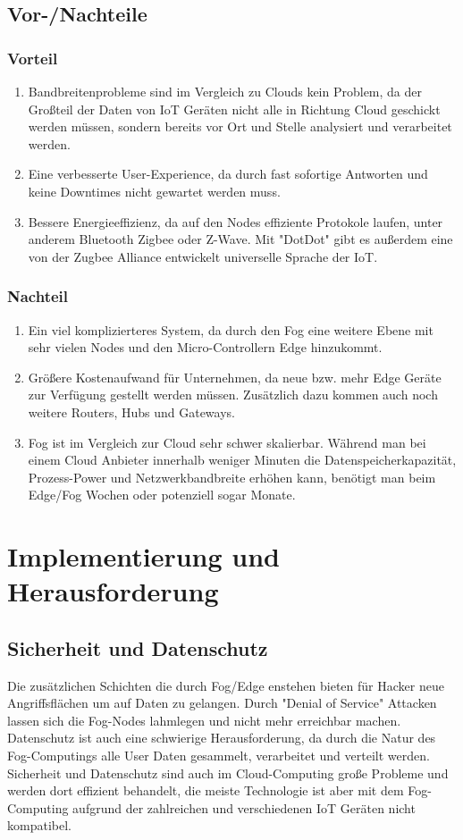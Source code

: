 \documentclass[10pt, a4paper, twocolumn]{article}
\begin{document}
\subsection{Vor-/Nachteile}
\subsubsection{Vorteil}
\begin{enumerate}
    \item Bandbreitenprobleme sind im Vergleich zu Clouds kein Problem, da der Großteil der Daten von IoT Geräten nicht alle in Richtung Cloud geschickt werden müssen, sondern bereits vor Ort und Stelle analysiert und verarbeitet werden. 
    \item Eine verbesserte User-Experience, da durch fast sofortige Antworten und keine Downtimes nicht gewartet werden muss.
    \item Bessere Energieeffizienz, da auf den Nodes effiziente Protokole laufen, unter anderem Bluetooth Zigbee oder Z-Wave. Mit "DotDot" gibt es außerdem eine von der Zugbee Alliance entwickelt universelle Sprache der IoT.
\end{enumerate}
\subsubsection{Nachteil}
\begin{enumerate}
    \item Ein viel komplizierteres System, da durch den Fog eine weitere Ebene mit sehr vielen Nodes und den Micro-Controllern Edge hinzukommt.
    \item Größere Kostenaufwand für Unternehmen, da neue bzw. mehr Edge Geräte zur Verfügung gestellt werden müssen. Zusätzlich dazu kommen auch noch weitere Routers, Hubs und Gateways. 
    \item Fog ist im Vergleich zur Cloud sehr schwer skalierbar. Während man bei einem Cloud Anbieter innerhalb weniger Minuten die Datenspeicherkapazität, Prozess-Power und Netzwerkbandbreite erhöhen kann, benötigt man beim Edge/Fog Wochen oder potenziell sogar Monate. 
\end{enumerate}

\section{Implementierung und Herausforderung}

\subsection{Sicherheit und Datenschutz}
Die zusätzlichen Schichten die durch Fog/Edge enstehen bieten für Hacker neue Angriffsflächen um auf Daten zu gelangen. Durch "Denial of Service" Attacken lassen sich die Fog-Nodes lahmlegen und nicht mehr erreichbar machen. Datenschutz ist auch eine schwierige Herausforderung, da durch die Natur des Fog-Computings alle User Daten gesammelt, verarbeitet und verteilt werden. Sicherheit und Datenschutz sind auch im Cloud-Computing große Probleme und werden dort effizient behandelt, die meiste Technologie ist aber mit dem Fog-Computing aufgrund der zahlreichen und verschiedenen IoT Geräten nicht kompatibel.
\end{document}
